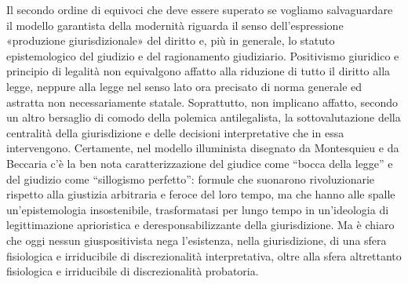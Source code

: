 Il secondo ordine di equivoci che deve essere superato se vogliamo salvaguardare il modello garantista della modernità riguarda il senso dell’espressione «produzione giurisdizionale» del diritto e, più in generale, lo statuto epistemologico del giudizio e del ragionamento giudiziario. Positivismo giuridico e principio di legalità non equivalgono affatto alla riduzione di tutto il diritto alla legge, neppure alla legge nel senso lato ora precisato di norma generale ed astratta non necessariamente statale. Soprattutto, non implicano affatto, secondo un altro bersaglio di comodo della polemica antilegalista, la sottovalutazione della centralità della giurisdizione e delle decisioni interpretative che in essa intervengono. Certamente, nel modello illuminista disegnato da Montesquieu e da Beccaria c’è la ben nota caratterizzazione del giudice come “bocca della legge” e del giudizio come “sillogismo perfetto”: formule che suonarono rivoluzionarie rispetto alla giustizia arbitraria e feroce del loro tempo, ma che hanno alle spalle un’epistemologia insostenibile, trasformatasi per lungo tempo in un’ideologia di legittimazione aprioristica e deresponsabilizzante della giurisdizione. Ma è chiaro che oggi nessun giuspositivista nega l’esistenza, nella giurisdizione, di una sfera fisiologica e irriducibile di discrezionalità interpretativa, oltre alla sfera altrettanto fisiologica e irriducibile di discrezionalità probatoria.
